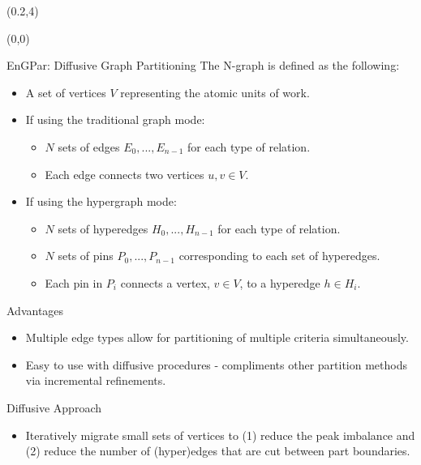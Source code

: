 \documentclass{beamer}
\begin{document}
\begin{textblock}{15.6}(0.2,4)
  \begin{textblock}{5}(0,0)
    \begin{block}{EnGPar: Diffusive Graph Partitioning}
      The N-graph is defined as the following:
      \begin{itemize}
      \item A set of vertices $V$ representing the atomic units of work.
      \item If using the traditional graph mode:
        \begin{itemize}
        \item $N$ sets of edges $E_0,...,E_{n-1}$ for each type of relation.
        \item Each edge connects two vertices $u,v \in V$.
        \end{itemize}
      \item If using the hypergraph mode:
        \begin{itemize}
        \item $N$ sets of hyperedges $H_0,...,H_{n-1}$ for each type of relation.
        \item $N$ sets of pins $P_0,...,P_{n-1}$ corresponding to each set of hyperedges.
        \item Each pin in $P_i$ connects a vertex, $v \in V$, to a hyperedge $h \in H_i$.
        \end{itemize}
      \end{itemize}

      Advantages
      \begin{itemize}
      \item Multiple edge types allow for partitioning of multiple criteria simultaneously.
      \item Easy to use with diffusive procedures - compliments other partition methods via incremental refinements.
      \end{itemize}
      
      Diffusive Approach
      \begin{itemize}
      \item Iteratively migrate small sets of vertices to (1) reduce the peak imbalance and (2) reduce the number of (hyper)edges that are cut between part boundaries.
      \end{itemize}
      

\end{block}
\end{textblock}
\end{textblock}
\end{document}
